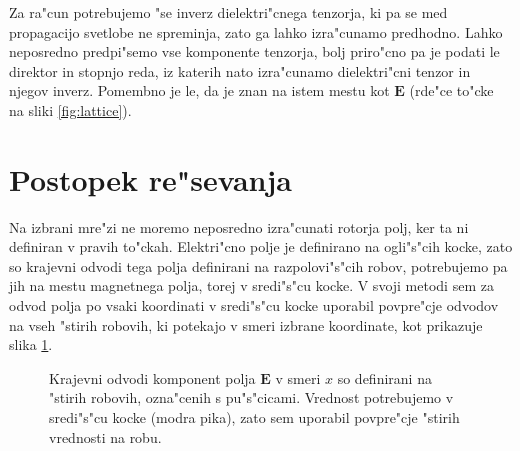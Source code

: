 \documentclass[12pt,twoside,openright,final,a4paper]{report}
\renewcommand{\vec}{\mathbf}
\newcommand{\E}{\vec E}
\begin{document}
Za ra"cun potrebujemo "se inverz dielektri"cnega tenzorja, ki pa se med propagacijo svetlobe ne spreminja, zato ga lahko izra"cunamo predhodno. 
Lahko neposredno predpi"semo vse komponente tenzorja, bolj priro"cno pa je podati le direktor in stopnjo reda, iz katerih nato izra"cunamo dielektri"cni tenzor in njegov inverz. 
Pomembno je le, da je znan na istem mestu kot $\E$ (rde"ce to"cke na sliki \ref{fig:lattice}).

\section{Postopek re"sevanja}
Na izbrani mre"zi ne moremo neposredno izra"cunati rotorja polj, ker ta ni definiran v pravih to"ckah. 
Elektri"cno polje je definirano na ogli"s"cih kocke, zato so krajevni odvodi tega polja definirani na razpolovi"s"cih robov, potrebujemo pa jih na mestu magnetnega polja, torej v sredi"s"cu kocke. 
V svoji metodi sem za odvod polja po vsaki koordinati v sredi"s"cu kocke uporabil povpre"cje odvodov na vseh "stirih robovih, ki potekajo v smeri izbrane koordinate, kot prikazuje slika \ref{fig:lattice-derivatives}. 

\begin{figure}[h]
\centering
 \caption{
 Krajevni odvodi komponent polja $\E$ v smeri $x$ so definirani na "stirih robovih, ozna"cenih s pu"s"cicami. 
 Vrednost potrebujemo v sredi"s"cu kocke (modra pika), zato sem uporabil povpre"cje "stirih vrednosti na robu. 
 }
 \label{fig:lattice-derivatives}
\end{figure}
\end{document}
